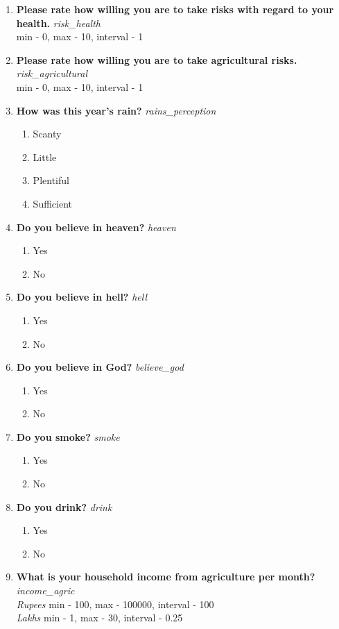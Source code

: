 \documentclass{article}
\begin{document}
\begin{enumerate}
\item {\bfseries Please rate how willing you are to take risks with regard to your health.}\emph{ risk\_health } 
\\min - 0, max - 10, interval - 1 
 
\item {\bfseries Please rate how willing you are to take agricultural risks.}\emph{ risk\_agricultural } 
\\min - 0, max - 10, interval - 1 
 
\item {\bfseries How was this year's rain?}\emph{ rains\_perception } 
\begin{enumerate} 
\item Scanty 
\item Little 
\item Plentiful 
\item Sufficient 
\end{enumerate} 
\item {\bfseries Do you believe in heaven?}\emph{ heaven } 
\begin{enumerate} 
\item Yes 
\item No 
\end{enumerate} 
\item {\bfseries Do you believe in hell?}\emph{ hell } 
\begin{enumerate} 
\item Yes 
\item No 
\end{enumerate} 
\item {\bfseries Do you believe in God?}\emph{ believe\_god } 
\begin{enumerate} 
\item Yes 
\item No 
\end{enumerate} 
\item {\bfseries Do you smoke?}\emph{ smoke } 
\begin{enumerate} 
\item Yes 
\item No 
\end{enumerate} 
\item {\bfseries Do you drink?}\emph{ drink } 
\begin{enumerate} 
\item Yes 
\item No 
\end{enumerate} 
\item {\bfseries What is your household income from agriculture per month?}\emph{ income\_agric } 
\\ \emph{ Rupees }min - 100, max - 100000, interval - 100 
\\ \emph{ Lakhs }min - 1, max - 30, interval - 0.25 
 

\end{enumerate}
\end{document}
